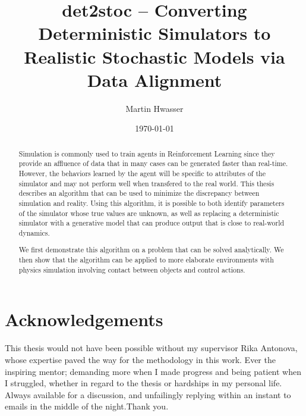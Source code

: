 \documentclass{kththesis}
\title{det2stoc -- Converting Deterministic Simulators to Realistic Stochastic Models via Data Alignment}
\author{Martin Hwasser}
\date{\today}
\begin{document}
\frontmatter
\titlepage
\begin{abstract}
Simulation is commonly used to train agents in Reinforcement Learning since they provide an affluence of data that in many cases can be generated faster than real-time. However, the behaviors learned by the agent will be specific to attributes of the simulator and may not perform well when transfered to the real world. This thesis describes an algorithm that can be used to minimize the discrepancy between simulation and reality. Using this algorithm, it is possible to both identify parameters of the simulator whose true values are unknown, as well as replacing a deterministic simulator with a generative model that can produce output that is close to real-world dynamics.

We first demonstrate this algorithm on a problem that can be solved analytically. We then show that the algorithm can be applied to more elaborate environments with physics simulation involving contact between objects and control actions.

\end{abstract}
\begin{otherlanguage}{swedish}
  \begin{abstract}
  \end{abstract}
\end{otherlanguage}

\section*{Acknowledgements}

This thesis would not have been possible without my supervisor Rika Antonova, whose expertise paved the way for the methodology in this work. Ever the inspiring mentor; demanding more when I made progress and being patient when I struggled, whether in regard to the thesis or hardships in my personal life. Always available for a discussion, and unfailingly replying within an instant to emails in the middle of the night.Thank you.

\tableofcontents
\mainmatter







 

\printbibliography[heading=bibintoc]

\appendix

\tailmatter
\end{document}
